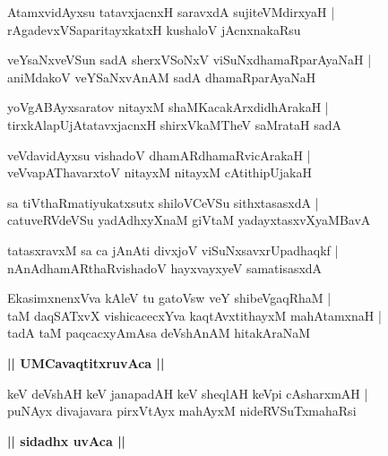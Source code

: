 \documentclass[twoside,12pt,openright]{book}
\newcounter{shloka}[chapter]
\def\uvaca#1{\centerline{{\large\textbf{#1}}}}
\begin{document}
\begin{shloka}%
AtamxvidAyxsu tatavxjacnxH saravxdA sujiteVMdirxyaH |\\
rAgadevxVSaparitayxkatxH kushaloV jAcnxnakaRsu 
\end{shloka}

\begin{shloka}%
veYsaNxveVSun sadA sherxVSoNxV viSuNxdhamaRparAyaNaH |\\
aniMdakoV veYSaNxvAnAM sadA dhamaRparAyaNaH 
\end{shloka}

\begin{shloka}%
yoVgABAyxsaratov nitayxM shaMKacakArxdidhArakaH |\\
tirxkAlapUjAtatavxjacnxH shirxVkaMTheV saMrataH sadA
\end{shloka}

\begin{shloka}%
veVdavidAyxsu vishadoV dhamARdhamaRvicArakaH |\\
veVvapAThavarxtoV nitayxM nitayxM cAtithipUjakaH
\end{shloka}

\begin{shloka}%
sa tiVthaRmatiyukatxsutx shiloVCeVSu sithxtasasxdA |\\
catuveRVdeVSu yadAdhxyXnaM giVtaM yadayxtasxvXyaMBavA 
\end{shloka}

\begin{shloka}%
tatasxravxM  sa  ca jAnAti divxjoV viSuNxsavxrUpadhaqkf |\\
nAnAdhamARthaRvishadoV hayxvayxyeV samatisasxdA 
\end{shloka}

\begin{shloka}%
EkasimxnenxVva kAleV tu gatoVsw veY shibeVgaqRhaM |\\
taM daqSATxvX vishicacecxYva kaqtAvxtithayxM mahAtamxnaH |\\
tadA taM paqcacxyAmAsa deVshAnAM hitakAraNaM 
\end{shloka}

\uvaca{|| UMCavaqtitxruvAca ||}

\begin{shloka}%
keV deVshAH keV janapadAH keV sheqlAH keVpi cAsharxmAH |\\
puNAyx divajavara pirxVtAyx mahAyxM nideRVSuTxmahaRsi 
\end{shloka}

\uvaca{|| sidadhx uvAca ||}
\end{document}
